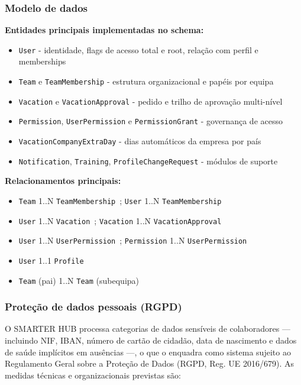 \documentclass[11pt,a4paper,twoside]{article}
\begin{document}
\subsubsection{Modelo de dados}

\textbf{Entidades principais implementadas no schema:}

\begin{itemize}
  \item \texttt{User} - identidade, flags de acesso total e root, relação com perfil e memberships
  \item \texttt{Team} e \texttt{TeamMembership} - estrutura organizacional e papéis por equipa
  \item \texttt{Vacation} e \texttt{VacationApproval} - pedido e trilho de aprovação multi-nível
  \item \texttt{Permission}, \texttt{UserPermission} e \texttt{PermissionGrant} - governança de acesso
  \item \texttt{VacationCompanyExtraDay} - dias automáticos da empresa por país
  \item \texttt{Notification}, \texttt{Training}, \texttt{ProfileChangeRequest} - módulos de suporte
\end{itemize}

\textbf{Relacionamentos principais:}

\begin{itemize}
  \item \texttt{Team} 1..N \texttt{TeamMembership}~; \texttt{User} 1..N \texttt{TeamMembership}
  \item \texttt{User} 1..N \texttt{Vacation}~; \texttt{Vacation} 1..N \texttt{VacationApproval}
  \item \texttt{User} 1..N \texttt{UserPermission}~; \texttt{Permission} 1..N \texttt{UserPermission}
  \item \texttt{User} 1..1 \texttt{Profile}
  \item \texttt{Team} (pai) 1..N \texttt{Team} (subequipa)
\end{itemize}

\subsubsection{Proteção de dados pessoais (RGPD)}

O SMARTER HUB processa categorias de dados sensíveis de colaboradores — incluindo NIF, IBAN, número de cartão de cidadão, data de nascimento e dados de saúde implícitos em ausências —, o que o enquadra como sistema sujeito ao Regulamento Geral sobre a Proteção de Dados (RGPD, Reg. UE 2016/679). As medidas técnicas e organizacionais previstas são:
\end{document}
